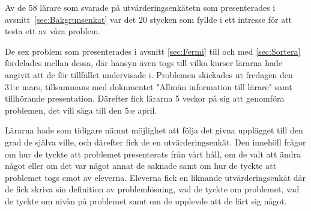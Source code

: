 \textcolor{lila}{Av de 58 lärare som svarade på utvärderingsenkätetn som presenterades i avsnitt~\ref{sec:Bakgrunsenkat} var det 20 stycken som fyllde i ett intresse för att testa ett av våra problem.} 

\textcolor{lila}{De sex problem som presenterades i avsnitt \ref{sec:Fermi} till och med \ref{sec:Sortera} fördelades mellan dessa, där hänsyn även togs till vilka kurser lärarna hade angivit att de för tillfället undervisade i. Problemen skickades ut fredagen den 31:e mars, tillsammans med dokumentet "Allmän information till lärare" samt tillhörande presentation. Därefter fick lärarna 5 veckor på sig att genomföra problemen, det vill säga till den 5:e april.} 

\textcolor{lila}{Lärarna hade som tidigare nämnt möjlighet att följa det givna upplägget till den grad de själva ville, och därefter fick de en utvärderingsenkät. Den innehöll frågor om hur de tyckte att problemet presenterats från vårt håll, om de valt att ändra något eller om det var något annat de saknade samt om hur de tyckte att problemet togs emot av eleverna. Eleverna fick en liknande utvärderingsenkät där de fick skriva sin definition av problemlösning, vad de tyckte om problemet, vad de tyckte om nivån på problemet samt om de upplevde att de lärt sig något.}
